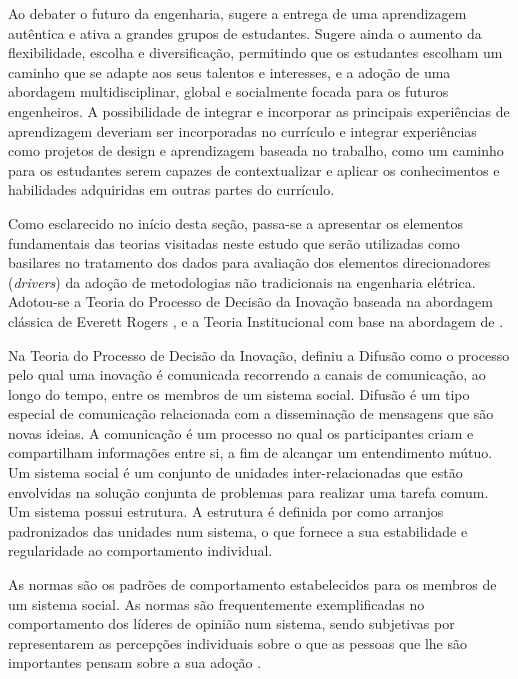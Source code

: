 \documentclass{textolivre}
\begin{document}
Ao debater o futuro da engenharia, \textcite{graham2018} sugere a entrega de uma aprendizagem autêntica e ativa a grandes grupos de estudantes. Sugere ainda o aumento da flexibilidade, escolha e diversificação, permitindo que os estudantes escolham um caminho que se adapte aos seus talentos e interesses, e a adoção de uma abordagem multidisciplinar, global e socialmente focada para os futuros engenheiros. A possibilidade de integrar e incorporar as principais experiências de aprendizagem deveriam ser incorporadas no currículo e integrar experiências como projetos de design e aprendizagem baseada no trabalho, como um caminho para os estudantes serem capazes de contextualizar e aplicar os conhecimentos e habilidades adquiridas em outras partes do currículo.

Como esclarecido no início desta seção, passa-se a apresentar os elementos fundamentais das teorias visitadas neste estudo que serão utilizadas como basilares no tratamento dos dados para avaliação dos elementos direcionadores (\textit{drivers}) da adoção de metodologias não tradicionais na engenharia elétrica. Adotou-se a Teoria do Processo de Decisão da Inovação baseada na abordagem clássica de Everett Rogers \cite{rogers1983}, e a Teoria Institucional com base na abordagem de \textcite{meyer1977}.

Na Teoria do Processo de Decisão da Inovação, \textcite{rogers1983} definiu a Difusão como o processo pelo qual uma inovação é comunicada recorrendo a canais de comunicação, ao longo do tempo, entre os membros de um sistema social. Difusão é um tipo especial de comunicação relacionada com a disseminação de mensagens que são novas ideias. A comunicação é um processo no qual os participantes criam e compartilham informações entre si, a fim de alcançar um entendimento mútuo. Um sistema social é um conjunto de unidades inter-relacionadas que estão envolvidas na solução conjunta de problemas para realizar uma tarefa comum. Um sistema possui estrutura. A estrutura é definida por \textcite{rogers1983} como arranjos padronizados das unidades num sistema, o que fornece a sua estabilidade e regularidade ao comportamento individual.

As normas são os padrões de comportamento estabelecidos para os membros de um sistema social. As normas são frequentemente exemplificadas no comportamento dos líderes de opinião num sistema, sendo subjetivas por representarem as percepções individuais sobre o que as pessoas que lhe são importantes pensam sobre a sua adoção \cite{hill1977}.
\end{document}
